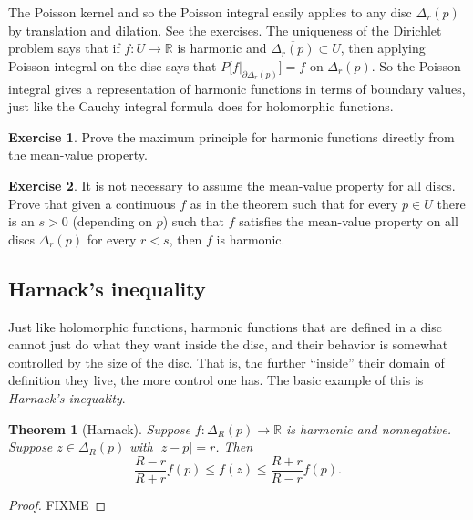 \documentclass[12pt,openany]{book}
\newcommand{\sabs}[1]{\lvert {#1} \rvert}
\newcommand{\R}{{\mathbb{R}}}
\newcommand{\myindex}[1]{#1\index{#1}}
\theoremstyle{plain}
\newtheorem{thm}{Theorem}[section]
\theoremstyle{remark}
\theoremstyle{definition}
\newenvironment{exbox}{%
    \def\FrameCommand{\vrule width 1pt \relax\hspace{10pt}}%
    \MakeFramed{\advance\hsize-\width\FrameRestore}%
}{%
    \endMakeFramed
}
\theoremstyle{exercise}
\newtheorem{exercise}{Exercise}[section]
\theoremstyle{example}
\begin{document}
The Poisson kernel and so the Poisson integral easily applies to any disc
$\Delta_r(p)$ by translation and dilation.  See the exercises.
The uniqueness of the Dirichlet problem says that if $f \colon U \to \R$
is harmonic and $\overline{\Delta_r(p)} \subset U$, then applying
Poisson integral on the disc says that $P\bigl[f|_{\partial
\Delta_r(p)}\bigr] = f$ on $\Delta_r(p)$.  So the Poisson integral gives
a representation of harmonic functions in terms of boundary values, just
like the Cauchy integral formula does for holomorphic functions.

\begin{exbox}
\begin{exercise}
Prove the maximum principle for harmonic functions directly from the
mean-value property.
\end{exercise}

\begin{exercise} \label{exercise:meanvaluesmallronly}
It is not necessary to assume the mean-value property for all discs.  Prove
that given a continuous $f$ as in the theorem such that for every $p \in U$
there is an $s > 0$ (depending on $p$) such that $f$ satisfies the mean-value
property on all discs $\Delta_r(p)$ for every $r < s$, then $f$ is
harmonic.
\end{exercise}
\end{exbox}

\subsection{Harnack's inequality}

Just like holomorphic functions, harmonic functions that are defined in a
disc cannot just do what they want inside the disc, and their behavior is
somewhat controlled by the size of the disc.  That is, the further
``inside'' their domain of definition they live, the more control one has.
The basic example of this is \emph{\myindex{Harnack's inequality}}.

\begin{thm}[Harnack]
Suppose $f \colon \Delta_R(p) \to \R$ is harmonic and nonnegative.
Suppose $z \in \Delta_R(p)$ with $\sabs{z-p} = r$.  Then
\begin{equation*}
\frac{R-r}{R+r} f(p) \leq f(z) \leq \frac{R+r}{R-r} f(p) .
\end{equation*}
\end{thm}

\begin{proof}
FIXME
\end{proof}
\end{document}
